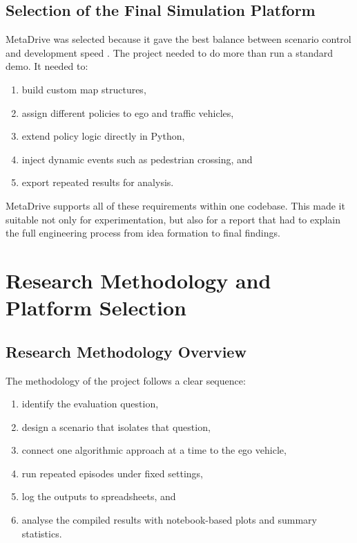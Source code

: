 \documentclass[12pt,a4paper]{report}
\begin{document}
\section{Selection of the Final Simulation Platform}
MetaDrive was selected because it gave the best balance between scenario control and development speed \cite{metadrive,metadrive_docs,metadrive_github}. The project needed to do more than run a standard demo. It needed to:

\begin{enumerate}[label=\arabic*.]
    \item build custom map structures,
    \item assign different policies to ego and traffic vehicles,
    \item extend policy logic directly in Python,
    \item inject dynamic events such as pedestrian crossing, and
    \item export repeated results for analysis.
\end{enumerate}

MetaDrive supports all of these requirements within one codebase. This made it suitable not only for experimentation, but also for a report that had to explain the full engineering process from idea formation to final findings.

\chapter{Research Methodology and Platform Selection}

\section{Research Methodology Overview}
The methodology of the project follows a clear sequence:

\begin{enumerate}[label=\arabic*.]
    \item identify the evaluation question,
    \item design a scenario that isolates that question,
    \item connect one algorithmic approach at a time to the ego vehicle,
    \item run repeated episodes under fixed settings,
    \item log the outputs to spreadsheets, and
    \item analyse the compiled results with notebook-based plots and summary statistics.
\end{enumerate}
\end{document}
